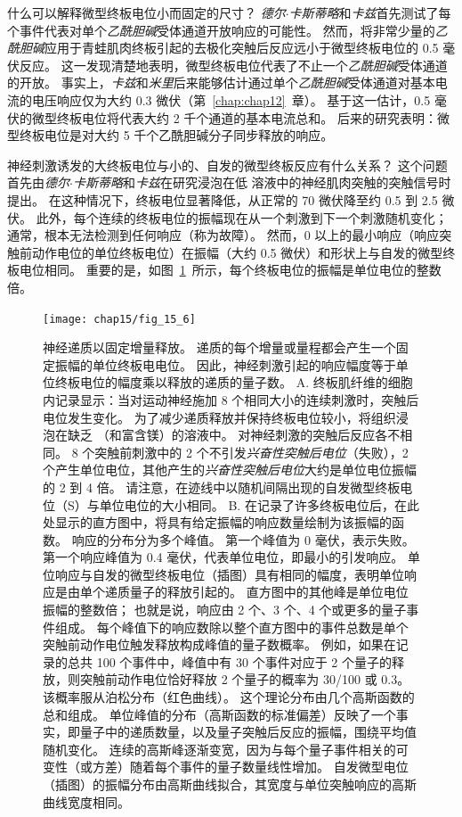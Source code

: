 什么可以解释微型终板电位小而固定的尺寸？
\textit{德尔$\cdot$卡斯蒂略}和\textit{卡兹}首先测试了每个事件代表对单个\textit{乙酰胆碱}受体通道开放响应的可能性。
然而，将非常少量的\textit{乙酰胆碱}应用于青蛙肌肉终板引起的去极化突触后反应远小于微型终板电位的 0.5 毫伏反应。 
这一发现清楚地表明，微型终板电位代表了不止一个\textit{乙酰胆碱}受体通道的开放。
事实上，\textit{卡兹}和\textit{米里}后来能够估计通过单个\textit{乙酰胆碱}受体通道对基本电流的电压响应仅为大约 0.3 微伏（第~\ref{chap:chap12}~章）。
基于这一估计，0.5 毫伏的微型终板电位将代表大约 2 千个通道的基本电流总和。
后来的研究表明：微型终板电位是对大约 5 千个乙酰胆碱分子同步释放的响应。


神经刺激诱发的大终板电位与小的、自发的微型终板反应有什么关系？
这个问题首先由\textit{德尔$\cdot$卡斯蒂略}和\textit{卡兹}在研究浸泡在低  溶液中的神经肌肉突触的突触信号时提出。
在这种情况下，终板电位显著降低，从正常的 70 微伏降至约 0.5 到 2.5 微伏。
此外，每个连续的终板电位的振幅现在从一个刺激到下一个刺激随机变化；
通常，根本无法检测到任何响应（称为故障）。
然而，0 以上的最小响应（响应突触前动作电位的单位终板电位）在振幅（大约 0.5 微伏）和形状上与自发的微型终板电位相同。
重要的是，如图~\ref{fig:15_6}~所示，每个终板电位的振幅是单位电位的整数倍。


\begin{figure}[htbp]
	\centering
	\texttt{[image: chap15/fig\_15\_6]}
	\caption{神经递质以固定增量释放。
		递质的每个增量或量程都会产生一个固定振幅的单位终板电电位。
		因此，神经刺激引起的响应幅度等于单位终板电位的幅度乘以释放的递质的量子数。
		A. 终板肌纤维的细胞内记录显示：当对运动神经施加 8 个相同大小的连续刺激时，突触后电位发生变化。
		为了减少递质释放并保持终板电位较小，将组织浸泡在缺乏 （和富含镁）的溶液中。
		对神经刺激的突触后反应各不相同。
		8 个突触前刺激中的 2 个不引发\textit{兴奋性突触后电位}（失败），2 个产生单位电位，其他产生的\textit{兴奋性突触后电位}大约是单位电位振幅的 2 到 4 倍。
		请注意，在迹线中以随机间隔出现的自发微型终板电位（S）与单位电位的大小相同\cite{liley1956quantal}。
		B. 在记录了许多终板电位后，在此处显示的直方图中，将具有给定振幅的响应数量绘制为该振幅的函数。
		响应的分布分为多个峰值。
		第一个峰值为 0 毫伏，表示失败。
		第一个响应峰值为 0.4 毫伏，代表单位电位，即最小的引发响应。
		单位响应与自发的微型终板电位（插图）具有相同的幅度，表明单位响应是由单个递质量子的释放引起的。
		直方图中的其他峰是单位电位振幅的整数倍；
		也就是说，响应由 2 个、3 个、4 个或更多的量子事件组成。
		每个峰值下的响应数除以整个直方图中的事件总数是单个突触前动作电位触发释放构成峰值的量子数概率。
		例如，如果在记录的总共 100 个事件中，峰值中有 30 个事件对应于 2 个量子的释放，则突触前动作电位恰好释放 2 个量子的概率为 30/100 或 0.3。
		该概率服从泊松分布（红色曲线）。
		这个理论分布由几个高斯函数的总和组成。
		单位峰值的分布（高斯函数的标准偏差）反映了一个事实，即量子中的递质数量，以及量子突触后反应的振幅，围绕平均值随机变化。
		连续的高斯峰逐渐变宽，因为与每个量子事件相关的可变性（或方差）随着每个事件的量子数量线性增加。
		自发微型电位（插图）的振幅分布由高斯曲线拟合，其宽度与单位突触响应的高斯曲线宽度相同\cite{boyd1956end}。}
	\label{fig:15_6}
\end{figure}


